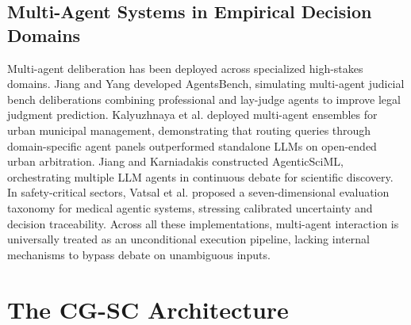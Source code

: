 \documentclass[conference]{IEEEtran}
\begin{document}
\subsection{Multi-Agent Systems in Empirical Decision Domains}
Multi-agent deliberation has been deployed across specialized high-stakes domains. Jiang and Yang \cite{jiang2025} developed AgentsBench, simulating multi-agent judicial bench deliberations combining professional and lay-judge agents to improve legal judgment prediction. Kalyuzhnaya et al. \cite{kalyuzhnaya2025} deployed multi-agent ensembles for urban municipal management, demonstrating that routing queries through domain-specific agent panels outperformed standalone LLMs on open-ended urban arbitration. Jiang and Karniadakis \cite{jiang2026sciml} constructed AgenticSciML, orchestrating multiple LLM agents in continuous debate for scientific discovery. In safety-critical sectors, Vatsal et al. \cite{vatsal2026} proposed a seven-dimensional evaluation taxonomy for medical agentic systems, stressing calibrated uncertainty and decision traceability. Across all these implementations, multi-agent interaction is universally treated as an unconditional execution pipeline, lacking internal mechanisms to bypass debate on unambiguous inputs.

\section{The CG-SC Architecture}
\end{document}
